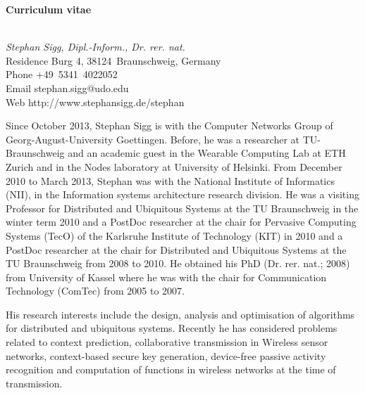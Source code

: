 \documentclass[12pt]{article}
\makeatletter
\newcommand{\Strasse}{Burg 4}
\newcommand{\Ort}{Braunschweig}
\newcommand{\Plz}{38124}
\newcommand{\Telefon}{+49~5341~4022052}
\newcommand{\Email}{stephan.sigg@udo.edu}
\newcommand{\Country}{Germany}
\makeatother
\begin{document}
\lhead{ }
\label{ErsteSeite}
\centerline{ \Large \textbf{Curriculum vitae}}
\vspace{-.5cm}
\begin{tabbing}
\hspace{2.4cm} \= \\
	\>\textit{Stephan Sigg, Dipl.-Inform., Dr. rer. nat.}\\[.1cm]
Residence	\> \Strasse, \Plz~\Ort, \Country\\[.1cm]
Phone \> \Telefon\\[.1cm]
Email \> \Email\\[.1cm]
Web \>http://www.stephansigg.de/stephan
\end{tabbing}



Since October 2013, Stephan Sigg is with the Computer Networks Group of Georg-August-University Goettingen. Before, he was a researcher at TU-Braunschweig and an academic guest in the Wearable Computing Lab at ETH Zurich and in the Nodes laboratory at University of Helsinki. From December 2010 to March 2013, Stephan was with the National Institute of Informatics (NII), in the Information systems architecture research division. He was a visiting Professor for Distributed and Ubiquitous Systems at the TU Braunschweig in the winter term 2010 and a PostDoc researcher at the chair for Pervasive Computing Systems (TecO) of the Karlsruhe Institute of Technology (KIT) in 2010 and a PostDoc researcher at the chair for Distributed and Ubiquitous Systems at the TU Braunschweig from 2008 to 2010. He obtained his PhD (Dr. rer. nat.; 2008) from University of Kassel where he was with the chair for Communication Technology (ComTec) from 2005 to 2007.

His research interests include the design, analysis and optimisation of algorithms for distributed and ubiquitous systems. 
Recently he has considered problems related to context prediction, collaborative transmission in Wireless sensor networks, context-based secure key generation, device-free passive activity recognition and computation of functions in wireless networks at the time of transmission. 
\end{document}

